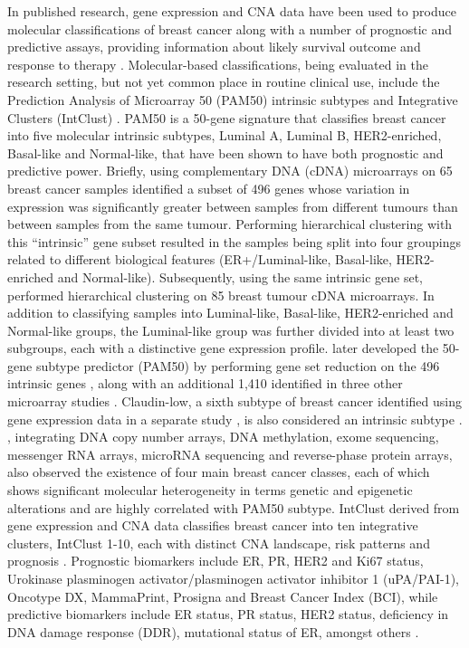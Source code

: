 In published research, gene expression and CNA data have been used to produce molecular classifications of breast cancer along with a number of prognostic and predictive assays, providing information about likely survival outcome and response to therapy \citep{pmid10963602, pmid22522925, pmid28882552}. Molecular-based classifications, being evaluated in the research setting, but not yet common place in routine clinical use, include the Prediction Analysis of Microarray 50 (PAM50) intrinsic subtypes and Integrative Clusters (IntClust) \citep{pmid10963602, pmid12829800, pmid22522925}. PAM50 is a 50-gene signature that classifies breast cancer into five molecular intrinsic subtypes, Luminal A, Luminal B, HER2-enriched, Basal-like and Normal-like, that have been shown to have both prognostic and predictive power. Briefly, using complementary DNA (cDNA) microarrays on 65 breast cancer samples \cite{pmid10963602} identified a subset of 496 genes whose variation in expression was significantly greater between samples from different tumours than between samples from the same tumour. Performing hierarchical clustering with this “intrinsic” gene subset resulted in the samples being split into four groupings related to different biological features (ER+/Luminal-like, Basal-like, HER2-enriched and Normal-like). Subsequently, using the same intrinsic gene set, \cite{pmid11553815} performed hierarchical clustering on 85 breast tumour cDNA microarrays. In addition to classifying samples into Luminal-like, Basal-like, HER2-enriched and Normal-like groups, the Luminal-like group was further divided into at least two subgroups, each with a distinctive gene expression profile. \cite{parker} later developed the 50-gene subtype predictor (PAM50) by performing gene set reduction on the 496 intrinsic genes \citep{pmid10963602, pmid11553815}, along with an additional 1,410 identified in three other microarray studies \citep{micro1, micro2, micro3}. Claudin-low, a sixth subtype of breast cancer identified using gene expression data in a separate study \citep{pmid17493263, pmid20813035}, is also considered an intrinsic subtype \citep{pmid32286297}. \cite{TCGA}, integrating DNA copy number arrays, DNA methylation, exome sequencing, messenger RNA arrays, microRNA sequencing and reverse-phase protein arrays, also observed the existence of four main breast cancer classes, each of which shows significant molecular heterogeneity in terms genetic and epigenetic alterations and are highly correlated with PAM50 subtype. IntClust derived from gene expression and CNA data classifies breast cancer into ten integrative clusters, IntClust 1-10, each with distinct CNA landscape, risk patterns and prognosis \citep{pmid22522925}. Prognostic biomarkers include ER, PR, HER2 and Ki67 status, Urokinase plasminogen activator/plasminogen activator inhibitor 1 (uPA/PAI-1), Oncotype DX, MammaPrint, Prosigna and Breast Cancer Index (BCI), while predictive biomarkers include ER status, PR status, HER2 status, deficiency in DNA damage response (DDR), mutational status of ER, amongst others \citep{pmid24402422, pmid28882552}. 

